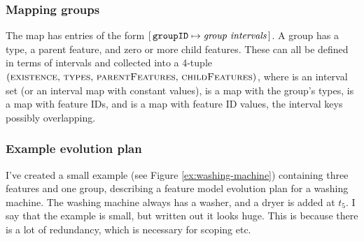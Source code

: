 \subsubsection{Mapping groups}
\label{subsub:mapping-groups}


The \groups{} map has entries of the form $[\,\texttt{groupID} \mapsto \textit{group intervals}\,]$. A group has a type, a parent feature, and zero or more child features. These can all be defined in terms of intervals and collected into a 4-tuple $(\textsc{existence},\, \textsc{types} ,\, \textsc{parentFeatures},\, \textsc{childFeatures})$, where  is an interval set (or an interval map with constant values),  is a map with the group's types,  is a map with feature IDs, and  is a map with feature ID values, the interval keys possibly overlapping. 

\subsubsection{Example evolution plan}
I've created a small example (see Figure \vref{ex:washing-machine}) containing three features and one group, describing a feature model evolution plan for a washing machine. The washing machine always has a washer, and a dryer is added at $t_5$. I say that the example is small, but written out it looks huge. This is because there is a lot of redundancy, which is necessary for scoping etc. 

